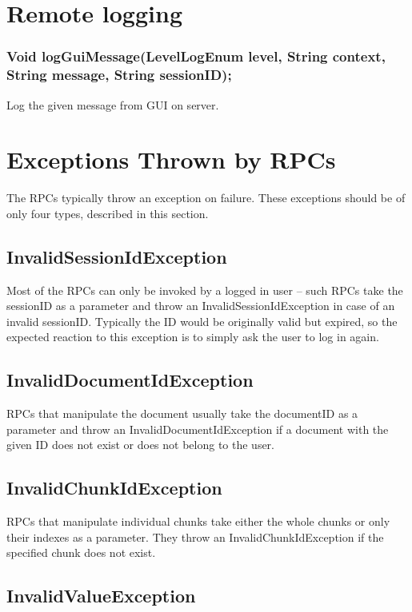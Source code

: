 \section{Remote logging}
    

\subsubsection{Void logGuiMessage(LevelLogEnum level, String context, String message, String sessionID);}
Log the given message from GUI on server.

\section{Exceptions Thrown by RPCs}

The RPCs typically throw an exception on failure. These exceptions should be of only four types, described in this section.

\subsection{InvalidSessionIdException}

Most of the RPCs can only be invoked by a logged in user -- such RPCs take the sessionID as a parameter and throw an InvalidSessionIdException in case of an invalid sessionID. Typically the ID would be originally valid but expired, so the expected reaction to this exception is to simply ask the user to log in again.

\subsection{InvalidDocumentIdException}

RPCs that manipulate the document usually take the documentID as a parameter and throw an InvalidDocumentIdException if a document with the given ID does not exist or does not belong to the user.

\subsection{InvalidChunkIdException}

RPCs that manipulate individual chunks take either the whole chunks or only their indexes as a parameter. They throw an InvalidChunkIdException if the specified chunk does not exist.

\subsection{InvalidValueException}

